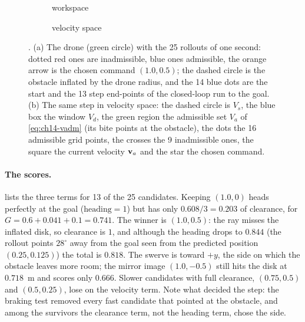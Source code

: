 \begin{figure}[tb]
  \centering
  \begin{subfigure}[b]{0.5\textwidth}\centering
    \caption{workspace}
  \end{subfigure}\hfill
  \begin{subfigure}[b]{0.48\textwidth}\centering
    \caption{velocity space}
  \end{subfigure}
  \caption{. (a) The drone (green circle) with the
  25 rollouts of one second: dotted red ones are inadmissible, blue ones
  admissible, the orange arrow is the chosen command $(1.0, 0.5)$; the dashed
  circle is the obstacle inflated by the drone radius, and the 14 blue dots
  are the start and the 13 step end-points of the closed-loop run to the
  goal. (b) The same step in
  velocity space: the dashed circle is $V_s$, the blue box the window $V_d$,
  the green region the admissible set $V_a$ of \cref{eq:ch14-vadm} (its bite
  points at the obstacle), the dots the 16 admissible grid points, the crosses
  the 9 inadmissible ones, the square the current velocity $\mathbf{v}_a$ and the
  star the chosen command.}
  \label{fig:ch14-example}
\end{figure}

\paragraph{The scores.}
 lists the three terms for 13 of the 25
candidates. Keeping $(1.0, 0)$ heads perfectly at the goal
($\mathrm{heading} = 1$) but has only $0.608/3 = 0.203$ of clearance, for
$G = 0.6 + 0.041 + 0.1 = 0.741$. The winner is $(1.0, 0.5)$: the ray misses
the inflated disk, so clearance is $1$, and although the heading drops to
$0.844$ (the rollout points $28^\circ$ away from the goal seen from the
predicted position $(0.25, 0.125)$) the total is $0.818$. The swerve is
toward $+y$, the side on which the obstacle leaves more room; the mirror
image $(1.0, -0.5)$ still hits the disk at $0.718$~m and scores only
$0.666$. Slower candidates with full clearance, $(0.75, 0.5)$ and
$(0.5, 0.25)$, lose on the velocity term. Note what decided the step: the
braking test removed every fast candidate that pointed at the obstacle, and
among the survivors the clearance term, not the heading term, chose the
side.

